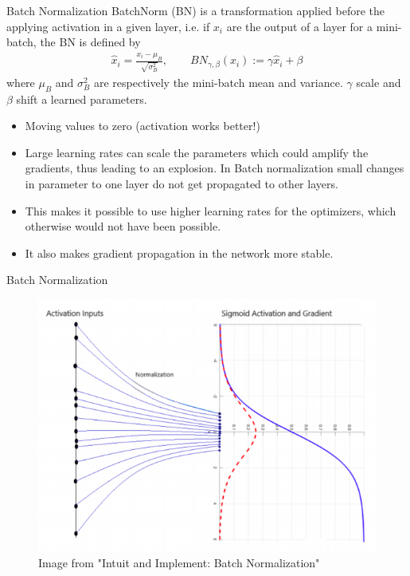 \documentclass[xcolor=pdftex,dvipsnames,table,mathserif]{beamer}
\begin{document}
\begin{frame}{Batch Normalization \cite{ioffe2015batch}  \cite{mishkin2015all}}
BatchNorm (BN) is a transformation applied before the applying activation in a given layer, i.e. if $x_i$ are the output of a layer for a mini-batch, the BN is defined by
\begin{eqnarray*}
\hat{x}_i = \frac{x_i-\mu_{B}}{\sqrt{\sigma^2_B}}, \quad \quad
BN_{\gamma,\beta}(x_i):= \gamma \hat{x}_i + \beta
\end{eqnarray*}
where $\mu_{B}$ and $\sigma^2_B$ are respectively the mini-batch mean and variance. $\gamma$ scale and $\beta$ shift a learned parameters.
\begin{itemize}
\item Moving values to zero (activation works better!) 
\item Large learning rates can scale the parameters which could amplify the gradients, thus leading to an explosion. In Batch normalization small changes in parameter to one layer do not get propagated to other layers. 
\item This makes it possible to use higher learning rates for the optimizers, which otherwise would not have been possible. 
\item It also makes gradient propagation in the network more stable.
\end{itemize}
\end{frame}


\begin{frame}{Batch Normalization}
\begin{figure}
\includegraphics[width=.75 \columnwidth]{../graphics/BatchNormalization}
\caption{Image from "Intuit and Implement: Batch Normalization"}
\end{figure}
\end{frame}
\end{document}
